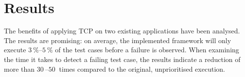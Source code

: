 \section*{Results}
The benefits of applying TCP on two existing applications have been analysed. The results are promising: on average, the implemented framework will only execute $\SIrange{3}{5}{\percent}$ of the test cases before a failure is observed. When examining the time it takes to detect a failing test case, the results indicate a reduction of more than $\SIrange{30}{50}{}$ times compared to the original, unprioritised execution.